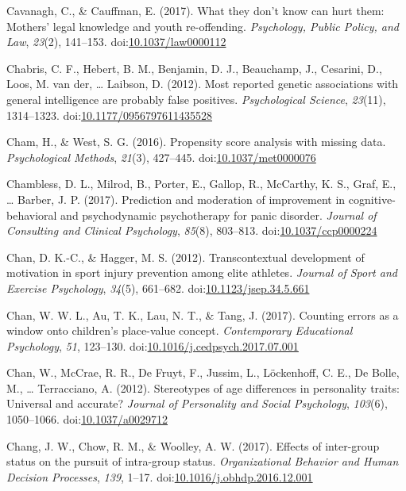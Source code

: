 \documentclass[english,man]{apa6}
\begin{document}
\hypertarget{ref-Cavanagh2017}{}
Cavanagh, C., \& Cauffman, E. (2017). What they don't know can hurt
them: Mothers' legal knowledge and youth re-offending. \emph{Psychology,
Public Policy, and Law}, \emph{23}(2), 141--153.
doi:\href{https://doi.org/10.1037/law0000112}{10.1037/law0000112}

\hypertarget{ref-Chabris2012}{}
Chabris, C. F., Hebert, B. M., Benjamin, D. J., Beauchamp, J., Cesarini,
D., Loos, M. van der, \ldots{} Laibson, D. (2012). Most reported genetic
associations with general intelligence are probably false positives.
\emph{Psychological Science}, \emph{23}(11), 1314--1323.
doi:\href{https://doi.org/10.1177/0956797611435528}{10.1177/0956797611435528}

\hypertarget{ref-Cham2016}{}
Cham, H., \& West, S. G. (2016). Propensity score analysis with missing
data. \emph{Psychological Methods}, \emph{21}(3), 427--445.
doi:\href{https://doi.org/10.1037/met0000076}{10.1037/met0000076}

\hypertarget{ref-Chambless2017a}{}
Chambless, D. L., Milrod, B., Porter, E., Gallop, R., McCarthy, K. S.,
Graf, E., \ldots{} Barber, J. P. (2017). Prediction and moderation of
improvement in cognitive-behavioral and psychodynamic psychotherapy for
panic disorder. \emph{Journal of Consulting and Clinical Psychology},
\emph{85}(8), 803--813.
doi:\href{https://doi.org/10.1037/ccp0000224}{10.1037/ccp0000224}

\hypertarget{ref-Chan2012a}{}
Chan, D. K.-C., \& Hagger, M. S. (2012). Transcontextual development of
motivation in sport injury prevention among elite athletes.
\emph{Journal of Sport and Exercise Psychology}, \emph{34}(5), 661--682.
doi:\href{https://doi.org/10.1123/jsep.34.5.661}{10.1123/jsep.34.5.661}

\hypertarget{ref-Chan2017}{}
Chan, W. W. L., Au, T. K., Lau, N. T., \& Tang, J. (2017). Counting
errors as a window onto children's place-value concept.
\emph{Contemporary Educational Psychology}, \emph{51}, 123--130.
doi:\href{https://doi.org/10.1016/j.cedpsych.2017.07.001}{10.1016/j.cedpsych.2017.07.001}

\hypertarget{ref-Chan2012}{}
Chan, W., McCrae, R. R., De Fruyt, F., Jussim, L., Löckenhoff, C. E., De
Bolle, M., \ldots{} Terracciano, A. (2012). Stereotypes of age
differences in personality traits: Universal and accurate? \emph{Journal
of Personality and Social Psychology}, \emph{103}(6), 1050--1066.
doi:\href{https://doi.org/10.1037/a0029712}{10.1037/a0029712}

\hypertarget{ref-Chang2017}{}
Chang, J. W., Chow, R. M., \& Woolley, A. W. (2017). Effects of
inter-group status on the pursuit of intra-group status.
\emph{Organizational Behavior and Human Decision Processes}, \emph{139},
1--17.
doi:\href{https://doi.org/10.1016/j.obhdp.2016.12.001}{10.1016/j.obhdp.2016.12.001}
\end{document}

